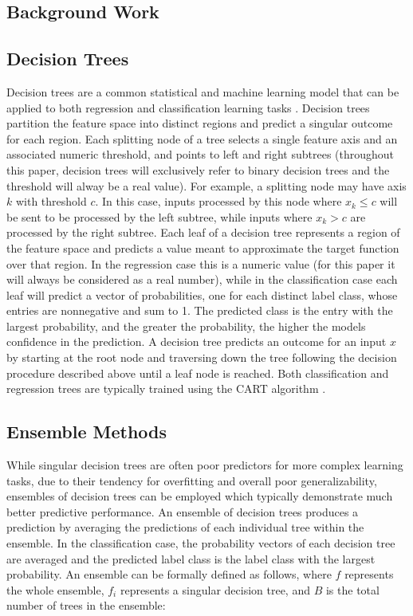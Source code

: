 \documentclass[pageno]{jpaper}
\begin{document}
\begin{doublespacing}
\section{Background Work}
\subsection{Decision Trees}
Decision trees are a common statistical and machine learning model that can be applied to both regression and classification learning tasks \cite{james}. Decision trees partition the feature space into distinct regions and predict a singular outcome for each region. Each splitting node of a tree selects a single feature axis and an associated numeric threshold, and points to left and right subtrees (throughout this paper, decision trees will exclusively refer to binary decision trees and the threshold will alway be a real value). For example, a splitting node may have axis $k$ with threshold $c$. In this case, inputs processed by this node where $x_k \le c$ will be sent to be processed by the left subtree, while inputs where $x_k > c$ are processed by the right subtree. Each leaf of a decision tree represents a region of the feature space and predicts a value meant to approximate the target function over that region. In the regression case this is a numeric value (for this paper it will always be considered as a real number), while in the classification case each leaf will predict a vector of probabilities, one for each distinct label class, whose entries are nonnegative and sum to 1. The predicted class is the entry with the largest probability, and the greater the probability, the higher the models confidence in the prediction. A decision tree predicts an outcome for an input $x$ by starting at the root node and traversing down the tree following the decision procedure described above until a leaf node is reached. Both classification and regression trees are typically trained using the CART algorithm \cite{breiman1984}.

\subsection{Ensemble Methods}
While singular decision trees are often poor predictors for more complex learning tasks, due to their tendency for overfitting and overall poor generalizability, ensembles of decision trees can be employed which typically demonstrate much better predictive performance. An ensemble of decision trees produces a prediction by averaging the predictions of each individual tree within the ensemble. In the classification case, the probability vectors of each decision tree are averaged and the predicted label class is the label class with the largest probability. An ensemble can be formally defined as follows, where $f$ represents the whole ensemble, $f_i$ represents a singular decision tree, and $B$ is the total number of trees in the ensemble:


\end{doublespacing}
\end{document}
